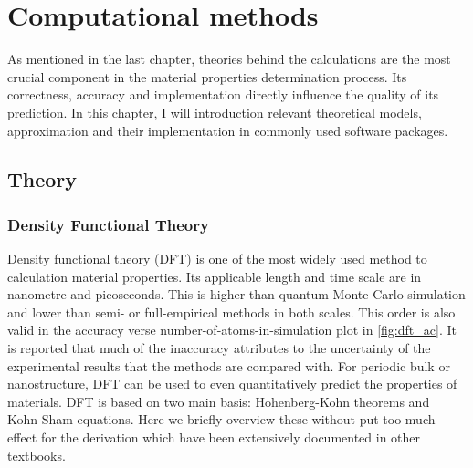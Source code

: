 
\chapter{Computational methods \label{chap:2}}

\ifpdf
    \graphicspath{{Chapter2/Figs/Raster/}{Chapter2/Figs/PDF/}{Chapter2/Figs/}{Chapter2/Figs/Vector/}}
\else
    \graphicspath{{Chapter2/Figs/Vector/}{Chapter2/Figs/}}
\fi

As mentioned in the last chapter, theories behind the calculations are the most crucial component in the material properties determination process. Its correctness, accuracy and implementation directly influence the quality of its prediction. In this chapter, I will introduction relevant theoretical models, approximation and their implementation in commonly used software packages.

\section{Theory}
\subsection{Density Functional Theory}

Density functional theory (DFT) is one of the most widely used method to calculation material properties. Its applicable length and time scale are in nanometre and picoseconds. This is higher than quantum Monte Carlo simulation and lower than semi- or full-empirical methods in both scales. This order is also valid in the accuracy verse number-of-atoms-in-simulation plot in \autoref{fig:dft_ac}. It is reported that much of the inaccuracy attributes to the uncertainty of the experimental results that the methods are compared with\cite{Kirklin2015}. For periodic bulk or nanostructure, DFT can be used to even quantitatively predict the properties of materials. DFT
is based on two main basis: Hohenberg-Kohn theorems\cite{Hohenberg1964} and Kohn-Sham equations\cite{Kohn1965}. Here we briefly overview these without put too much effect for the derivation which have been extensively documented in other textbooks. 

